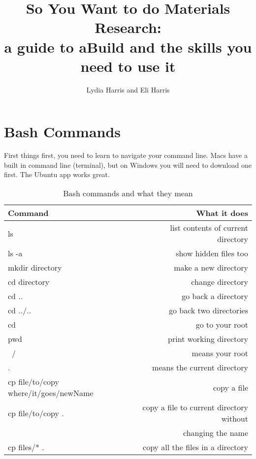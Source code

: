 \documentclass{article}
\title{So You Want to do Materials Research:\\[0.02em]\smaller{}a
guide to aBuild and the skills you need to use it}
\author{Lydia Harris and Eli Harris}
\begin{document}
\maketitle

\section{Bash Commands}

First things first, you need to learn to navigate your command
line. Macs have a built in command line (terminal), but on Windows you will need
to download one first. The Ubuntu app works great.

\begin{table}
        \begin{center}
                \caption{Bash commands and what they mean}
                \label{bashcommands}
                \begin{tabular}{l|r}
                        \textbf{Command} & \textbf{What it does}\\
                        \hline
                        ls & list contents of current directory \\
                        ls -a & show hidden files too \\
                        mkdir directory & make a new directory \\
                        cd directory & change directory \\
                        cd .. & go back a directory \\
                        cd ../.. & go back two directories \\
                        cd ~ & go to your root \\
                        pwd & print working directory \\
                        ~/ & means your root \\
                        . & means the current directory \\
                        cp file/to/copy where/it/goes/newName & copy
                        a file \\
                        cp file/to/copy . & copy a file to current
                        directory without \\
                         & changing the name \\
                        cp files/* . & copy all the files in a
                        directory \\

\end{tabular}
\end{center}
\end{table}
\end{document}
